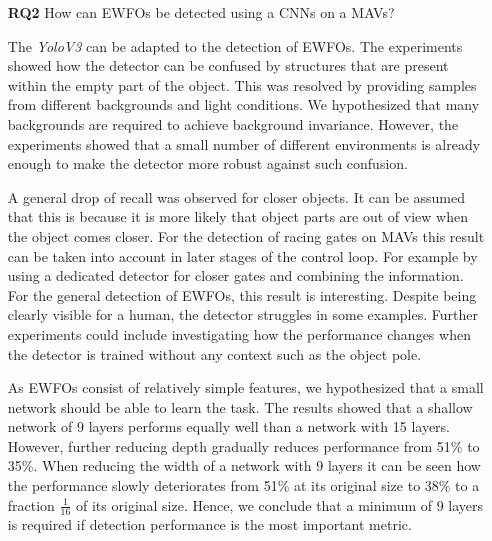 \begin{enumerate}
	In summary, we propose to fully synthesize environments when creating training data for the detection of \acp{EWFO} on \acp{MAV}. Furthermore, the precision can be improved by training the detector based on view angles it will see in the real world, possibly by simulating the flight behaviour. In order to transfer the detector to the real world, we recommend to use image augmentation. Particularly augmenting the images by modelling lens distortion improves the performance on the investigated dataset.

	\item[\textbf{RQ2}]How can \acp{EWFO} be detected using a \acp{CNN} on a \acp{MAV}?
	
	The \textit{YoloV3} can be adapted to the detection of \acp{EWFO}. The experiments showed how the detector can be confused by structures that are present within the empty part of the object. This was resolved by providing samples from different backgrounds and light conditions. We hypothesized that many backgrounds are required to achieve background invariance. However, the experiments showed that a small number of different environments is already enough to make the detector more robust against such confusion.
		
	A general drop of recall was observed for closer objects. It can be assumed that this is because it is more likely that object parts are out of view when the object comes closer. For the detection of racing gates on \acp{MAV} this result can be taken into account in later stages of the control loop. For example by using a dedicated detector for closer gates and combining the information.  For the general detection of \acp{EWFO}, this result is interesting. Despite being clearly visible for a human, the detector struggles in some examples. Further experiments could include investigating how the performance changes when the detector is trained without any context such as the object pole.
	
	As \acp{EWFO} consist of relatively simple features, we hypothesized that a small network should be able to learn the task. The results showed that a shallow network of 9 layers performs equally well than a network with 15 layers. However, further reducing depth gradually reduces performance from 51\% to 35\%. When reducing the width of a network with 9 layers it can be seen how the performance slowly deteriorates from 51\% at its original size to 38\% to a fraction $\frac{1}{16}$ of its original size. 
	Hence, we conclude that a minimum of 9 layers is required if detection performance is the most important metric.
	

\end{enumerate}

